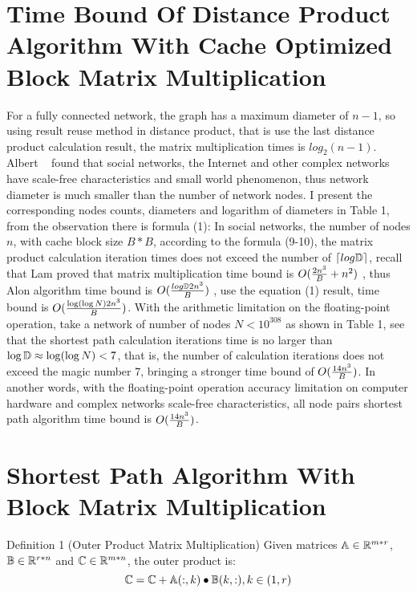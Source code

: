 \documentclass[review]{cvpr}
\begin{document}

\section{Time Bound Of Distance Product Algorithm With Cache Optimized Block Matrix Multiplication}
For a fully connected network, the graph has a maximum diameter of $n-1$, so using result reuse method in distance product, that is use the last distance product calculation result, the matrix multiplication times is $log_2(n-1)$.
Albert ~\cite{albert1999diameter} found that social networks, the Internet and other complex networks have scale-free characteristics and small world phenomenon, thus network diameter is much smaller than the number of network nodes.
I present the corresponding nodes counts, diameters and logarithm of diameters in Table 1, from the observation there is formula (1):
In social networks, the number of nodes $n$, with cache block size $B*B$, according to the formula (9-10), the matrix product calculation iteration times does not exceed the number of $\lceil{log\Bbb D}\rceil$, recall that Lam \etal proved that matrix multiplication time bound is \(O({2n^3 \over B}+{n^2})\) ,
thus Alon \etal algorithm time bound is \(O({log\Bbb D2n^3\over B})\) , use the equation (1) result, time bound is \(O({ \log(\log{N})2n^3\over B})\).
With the arithmetic limitation on the floating-point operation, \eg take a network of number of nodes $N<10^{308}$
as shown in Table 1, see that the shortest path calculation iterations time is no larger than $\log{\Bbb D}\approx{\log(\log{N})}<7$, that is, the number of calculation iterations does not exceed the magic number 7,
bringing a stronger time bound of \(O({14n^3\over B})\).
In another words, with the floating-point operation accuracy limitation on computer hardware and complex networks scale-free characteristics, all node pairs shortest path algorithm time bound is \(O({14n^3\over B})\).




\section{Shortest Path Algorithm With Block Matrix Multiplication}

Definition 1 (Outer Product Matrix Multiplication) Given matrices \(\Bbb A \in \Bbb R^{m*r}\), \(\Bbb B \in \Bbb R^{r*n}\) and \(\Bbb C \in \Bbb R^{m*n}\), the outer product is:
\begin{equation}
\Bbb C = \Bbb C  + \Bbb A(:,k)\bullet \Bbb B(k,:) , k \in (1,r)
\end{equation}
\end{document}
